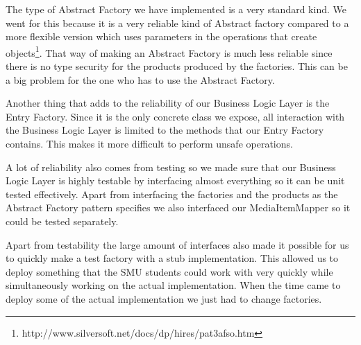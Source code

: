 \documentclass[../report.tex]{subfiles}
\begin{document}
The type of Abstract Factory we have implemented is a very standard kind. We went for this because it is a very reliable kind of Abstract factory compared to a more flexible version which uses parameters in the operations that create objects\footnote{http://www.silversoft.net/docs/dp/hires/pat3afso.htm}. That way of making an Abstract Factory is much less reliable since there is no type security for the products produced by the factories. This can be a big problem for the one who has to use the Abstract Factory.

Another thing that adds to the reliability of our Business Logic Layer is the Entry Factory. Since it is the only concrete class we expose, all interaction with the Business Logic Layer is limited to the methods that our Entry Factory contains. This makes it more difficult to perform unsafe operations.

A lot of reliability also comes from testing so we made sure that our Business Logic Layer is highly testable by interfacing almost everything so it can be unit tested effectively. Apart from interfacing the factories and the products as the Abstract Factory pattern specifies we also interfaced our MediaItemMapper so it could be tested separately. 

Apart from testability the large amount of interfaces also made it possible for us to quickly make a test factory with a stub implementation. This allowed us to deploy something that the SMU students could work with very quickly while simultaneously working on the actual implementation. When the time came to deploy some of the actual implementation we just had to change factories.

\end{document}
